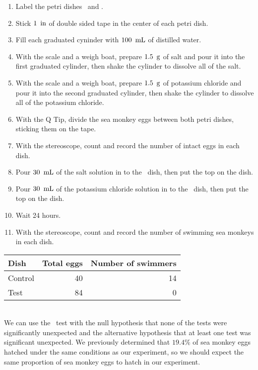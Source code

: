 \documentclass[12pt]{article}
\begin{document}
\begin{enumerate}
    \item Label the petri dishes \control\ and \test.
    \item Stick $1\operatorname{\ in}$ of double sided tape in the center of each petri dish.
    \item Fill each graduated cyninder with $100\operatorname{\ mL}$ of distilled water.
    \item With the scale and a weigh boat, prepare $1.5\operatorname{\ g}$ of salt and pour it into the first graduated cylinder, then shake the cylinder to dissolve all of the salt.
    \item With the scale and a weigh boat, prepare $1.5\operatorname{\ g}$ of potassium chloride and pour it into the second graduated cylinder, then shake the cylinder to dissolve all of the potassium chloride.
    \item With the Q Tip, divide the sea monkey eggs between both petri dishes, sticking them on the tape.
    \item With the stereoscope, count and record the number of intact eggs in each dish.
    \item Pour $30\operatorname{\ mL}$ of the salt solution in to the \control\ dish, then put the top on the dish.
    \item Pour $30\operatorname{\ mL}$ of the potassium chloride solution in to the \test\ dish, then put the top on the dish.
    \item Wait 24 hours.
    \item With the stereoscope, count and record the number of swimming sea monkeys in each dish.
\end{enumerate}\double

\begin{center}
\begin{tabular}{l|rr}
Dish & Total eggs & Number of swimmers \\
\hline
Control & 40 & 14 \\
Test & 84 & 0 \\
\end{tabular}
\end{center}\double

\\
We can use the \chisq\ test with the null hypothesis that none of the tests were significantly unexpected and the alternative hypothesis that at least one test was significant unexpected. We previously determined that $19.4\%$ of sea monkey eggs hatched under the same conditions as our experiment, so we should expect the same proportion of sea monkey eggs to hatch in our experiment.\double
\end{document}
